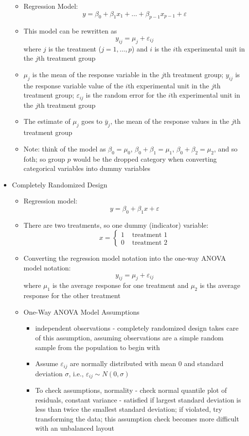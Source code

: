 \documentclass[12pt]{article}
\begin{document}
\begin{itemize}
\begin{itemize}
\item Regression Model: $$y = \beta_0 + \beta_1x_1 + \dots + \beta_{p-1}x_{p-1} + \varepsilon $$ 
\item This model can be rewritten as $$ y_{ij} = \mu_j + \varepsilon_{ij} $$ where $j$ is the treatment ($j = 1,\dots,p$) and $i$ is the $i$th experimental unit in the $j$th treatment group
\item $\mu_j$ is the mean of the response variable in the $j$th treatment group; $y_{ij}$ is the response variable value of the $i$th experimental unit in the $j$th treatment group; $\varepsilon_{ij}$ is the random error for the $i$th experimental unit in the $j$th treatment group
\item The estimate of $\mu_j$ goes to $\bar{y}_j$, the mean of the response values in the $j$th treatment group
\item Note: think of the model as $\beta_0 = \mu_0$, $\beta_0 + \beta_1 = \mu_1$, $\beta_0 + \beta_2 = \mu_2$, and so foth; so group $p$ would be the dropped category when converting categorical variables into dummy variables \end{itemize}
\item Completely Randomized Design \begin{itemize} 
\item Regression model: $$ y = \beta_0 + \beta_1x + \varepsilon $$ 
\item There are two treatments, so one dummy (indicator) variable: $$ x = \begin{cases} 1 &\text{ treatment 1} \\ 0 &\text{ treatment 2} \end{cases} $$ 
\item Converting the regression model notation into the one-way ANOVA model notation: $$ y_{ij} = \mu_j + \varepsilon_{ij} $$ where $\mu_1$ is the average response for one treatment and $\mu_2$ is ths average response for the other treatment 
\item One-Way ANOVA Model Assumptions \begin{itemize} 
\item independent observations - completely randomized design takes care of this assumption, assuming observations are a simple random sample from the population to begin with
\item Assume $\varepsilon_{ij}$ are normally distributed with mean $0$ and standard deviation $\sigma$, i.e., $\varepsilon_{ij} \sim N(0, \sigma)$
\item To check assumptions, normality - check normal quantile plot of residuals, constant variance - satisfied if largest standard deviation is less than twice the smallest standard deviation; if violated, try transforming the data; this assumption check becomes more difficult with an unbalanced layout 

\end{itemize}
\end{itemize}
\end{itemize}
\end{document}
